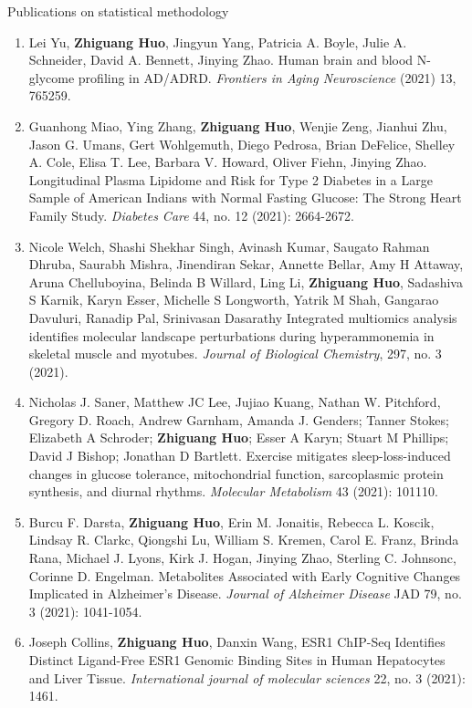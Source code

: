 \documentclass{resume} %
\begin{document}
\begin{rSection}{Publications on statistical methodology}
\begin{enumerate}[noitemsep,topsep=0pt, resume]
\item
Lei Yu, {\bf Zhiguang Huo}, Jingyun Yang, Patricia A. Boyle, Julie A. Schneider, David A. Bennett, Jinying Zhao.
Human brain and blood N-glycome profiling in AD/ADRD.
\emph{Frontiers in Aging Neuroscience} (2021) 13, 765259. 
\label{bioinfo_23}


\item
Guanhong Miao, Ying Zhang, {\bf Zhiguang Huo}, Wenjie Zeng, Jianhui Zhu, Jason G. Umans, Gert Wohlgemuth, Diego Pedrosa, Brian DeFelice, Shelley A. Cole, Elisa T. Lee, Barbara V. Howard, Oliver Fiehn, Jinying Zhao.
Longitudinal Plasma Lipidome and Risk for Type 2 Diabetes in a Large Sample of American Indians with Normal Fasting Glucose: The Strong Heart Family Study. 
\emph{Diabetes Care}  44, no. 12 (2021): 2664-2672.
\label{bioinfo_22}


\item
Nicole Welch, Shashi Shekhar Singh, Avinash Kumar, Saugato Rahman Dhruba, Saurabh Mishra, Jinendiran Sekar, Annette Bellar, Amy H Attaway, Aruna Chelluboyina, Belinda B Willard, Ling Li, {\bf Zhiguang Huo}, Sadashiva S Karnik, Karyn Esser, Michelle S Longworth, Yatrik M Shah, Gangarao Davuluri, Ranadip Pal, Srinivasan Dasarathy
Integrated multiomics analysis identifies molecular landscape perturbations during hyperammonemia in skeletal muscle and myotubes. 
\emph{Journal of Biological Chemistry}, 297, no. 3 (2021).
\label{bioinfo_21} 


\item  
Nicholas J. Saner, Matthew JC Lee, Jujiao Kuang, Nathan W. Pitchford, Gregory D. Roach, Andrew Garnham, Amanda J. Genders; Tanner Stokes; Elizabeth A Schroder; {\bf Zhiguang Huo}; Esser A Karyn; Stuart M Phillips; David J Bishop; Jonathan D Bartlett.
Exercise mitigates sleep-loss-induced changes in glucose tolerance, mitochondrial function, sarcoplasmic protein synthesis, and diurnal rhythms.
\emph{Molecular Metabolism} 43 (2021): 101110.
\label{bioinfo_20} 


\item  
Burcu F. Darsta, {\bf Zhiguang Huo}, Erin M. Jonaitis, Rebecca L. Koscik, Lindsay R. Clarkc, Qiongshi Lu, William S. Kremen, Carol E. Franz, Brinda Rana, Michael J. Lyons, Kirk J. Hogan, Jinying Zhao, Sterling C. Johnsonc, Corinne D. Engelman.
Metabolites Associated with Early Cognitive Changes Implicated in Alzheimer's Disease.
\emph{Journal of Alzheimer Disease} JAD 79, no. 3 (2021): 1041-1054.
\label{bioinfo_19} 


\item  Joseph Collins, {\bf Zhiguang Huo}, Danxin Wang, 
ESR1 ChIP-Seq Identifies Distinct Ligand-Free ESR1 Genomic Binding Sites in Human Hepatocytes and Liver Tissue.
\emph{International journal of molecular sciences} 22, no. 3 (2021): 1461.
\label{bioinfo_18}


\end{enumerate}
\end{rSection}
\end{document}
